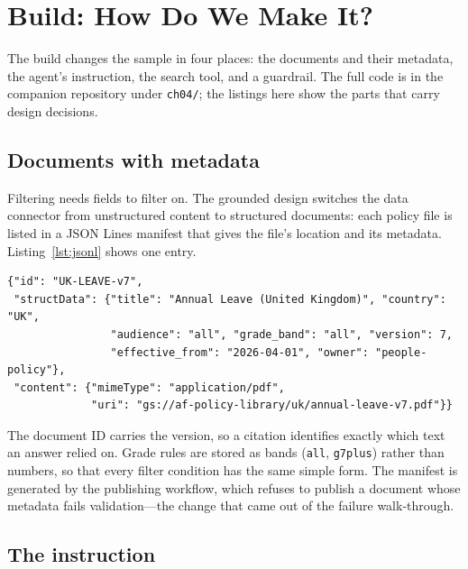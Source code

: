 
\section{Build: How Do We Make It?}
\label{sec:policy-build}

The build changes the sample in four places: the documents and their metadata, the agent's instruction, the search tool, and a guardrail. The full code is in the companion repository under \texttt{ch04/}; the listings here show the parts that carry design decisions.

\subsection{Documents with metadata}

Filtering needs fields to filter on. The grounded design switches the data connector from unstructured content to structured documents: each policy file is listed in a JSON Lines manifest that gives the file's location and its metadata. Listing~\ref{lst:jsonl} shows one entry.

\begin{lstlisting}[language={}, caption={One entry in the policy manifest (\texttt{policies.jsonl}). The connector's data schema becomes \texttt{document}.}, label={lst:jsonl}]
{"id": "UK-LEAVE-v7",
 "structData": {"title": "Annual Leave (United Kingdom)", "country": "UK",
                "audience": "all", "grade_band": "all", "version": 7,
                "effective_from": "2026-04-01", "owner": "people-policy"},
 "content": {"mimeType": "application/pdf",
             "uri": "gs://af-policy-library/uk/annual-leave-v7.pdf"}}
\end{lstlisting}

The document ID carries the version, so a citation identifies exactly which text an answer relied on. Grade rules are stored as bands (\texttt{all}, \texttt{g7plus}) rather than numbers, so that every filter condition has the same simple form. The manifest is generated by the publishing workflow, which refuses to publish a document whose metadata fails validation---the change that came out of the failure walk-through.

\subsection{The instruction}

